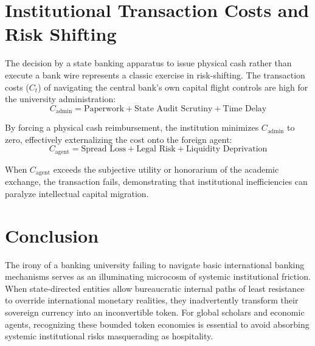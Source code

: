 \documentclass[reprint,amsmath,amssymb,aps,prd,showkeys]{revtex4-2}
\begin{document}
\section{Institutional Transaction Costs and Risk Shifting}
The decision by a state banking apparatus to issue physical cash rather than execute a bank wire represents a classic exercise in risk-shifting. The transaction costs ($C_t$) of navigating the central bank’s own capital flight controls are high for the university administration:
\begin{equation}
C_{\text{admin}} = \text{Paperwork} + \text{State Audit Scrutiny} + \text{Time Delay}
\end{equation}

By forcing a physical cash reimbursement, the institution minimizes $C_{\text{admin}}$ to zero, effectively externalizing the cost onto the foreign agent:
\begin{equation}
C_{\text{agent}} = \text{Spread Loss} + \text{Legal Risk} + \text{Liquidity Deprivation}
\end{equation}

When $C_{\text{agent}}$ exceeds the subjective utility or honorarium of the academic exchange, the transaction fails, demonstrating that institutional inefficiencies can paralyze intellectual capital migration.

\section{Conclusion}
The irony of a banking university failing to navigate basic international banking mechanisms serves as an illuminating microcosm of systemic institutional friction. When state-directed entities allow bureaucratic internal paths of least resistance to override international monetary realities, they inadvertently transform their sovereign currency into an inconvertible token. For global scholars and economic agents, recognizing these bounded token economies is essential to avoid absorbing systemic institutional risks masquerading as hospitality.
\end{document}
